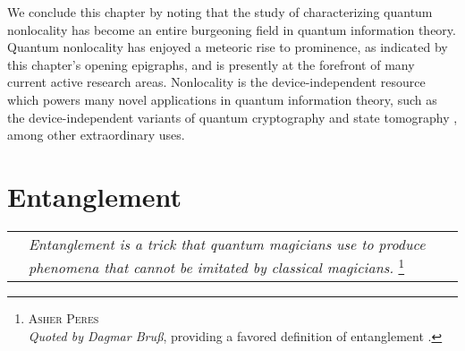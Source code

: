 \documentclass[
  12pt          %
  ,letterpaper  %
  ,center       %
  ,noupper      %
  ,english,fleqn]{uconnthesis}
\begin{document}
We conclude this chapter by noting that the study of characterizing quantum nonlocality has become an entire burgeoning field in quantum information theory. Quantum nonlocality has enjoyed a meteoric rise to prominence, as indicated by this chapter's opening epigraphs, and is presently at the forefront of many current active research areas. Nonlocality is the device-independent resource which powers many novel applications in quantum information theory, such as the device-independent variants of quantum cryptography \cite{CryptoPRA,CryptoPRL,masanesDIQKD,CryptoDIQKD,RenatoQKDNature,DIRandomness,scarani2012device,CryptoDIQKDarXiv2006,CryptoDIQKDarXiv,CryptoDIQKDEarly,CryptoDIQKD2010,CryptoDIQKDNJP} and state tomography \cite{DITomagraphy2013,DITomagraphy2014}, among other extraordinary uses. 
















\chapter{Entanglement}
\vspace*{\fill}
\begin{spacing}{1.5}
\begin{tabularx}{400pt}{m{1cm}Lm{1cm}}
& \noindent\textit{Entanglement is a trick that quantum magicians use to produce phenomena that cannot be imitated
by classical magicians.}
\footnote{\textsc{Asher Peres}\\ \textit{Quoted by Dagmar Bruß}, providing a favored definition of entanglement \citet{characterizingentanglement}.}  &
\end{tabularx}
\end{spacing}
\vspace*{\fill}
\end{document}
